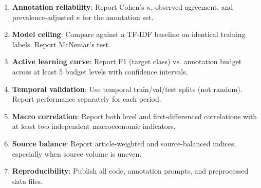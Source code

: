 \begin{enumerate}
    \item \textbf{Annotation reliability}: Report Cohen's $\kappa$, observed agreement, and prevalence-adjusted $\kappa$ for the annotation set.
    \item \textbf{Model ceiling}: Compare against a TF-IDF baseline on identical training labels. Report McNemar's test.
    \item \textbf{Active learning curve}: Report F1 (target class) vs. annotation budget across at least 5 budget levels with confidence intervals.
    \item \textbf{Temporal validation}: Use temporal train/val/test splits (not random). Report performance separately for each period.
    \item \textbf{Macro correlation}: Report both level and first-differenced correlations with at least two independent macroeconomic indicators.
    \item \textbf{Source balance}: Report article-weighted and source-balanced indices, especially when source volume is uneven.
    \item \textbf{Reproducibility}: Publish all code, annotation prompts, and preprocessed data files.
\end{enumerate}
